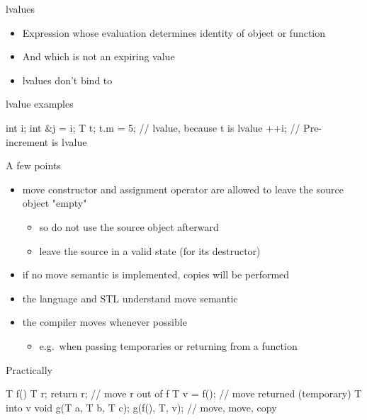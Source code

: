 \begin{frame}[fragile]
  \begin{block}{lvalues}
    \begin{itemize}
      \item Expression whose evaluation determines identity of object or function
      \item And which is not an expiring value
      \item lvalues don't bind to 
    \end{itemize}
  \end{block}
  \begin{exampleblock}{lvalue examples}
    \begin{cppcode*}{}
      int i;
      int &j = i;
      T t;
      t.m = 5; // lvalue, because t is lvalue
      ++i; // Pre-increment is lvalue
    \end{cppcode*}
  \end{exampleblock}
\end{frame}

\begin{frame}[fragile]
  \begin{block}{A few points}
    \begin{itemize}
    \item move constructor and assignment operator are allowed to leave the source object "empty"
      \begin{itemize}
      \item so do not use the source object afterward
      \item leave the source in a valid state (for its destructor)
      \end{itemize}
    \item if no move semantic is implemented, copies will be performed
    \item the language and STL understand move semantic
    \item the compiler moves whenever possible
      \begin{itemize}
      \item e.g.\ when passing temporaries or returning from a function
      \end{itemize}
    \end{itemize}
  \end{block}
  \pause
  \begin{exampleblock}{Practically}
    \begin{cppcode*}{}
      T f() { T r; return r; } // move r out of f
      T v = f(); // move returned (temporary) T into v
      void g(T a, T b, T c);
      g(f(), T{}, v); // move, move, copy
    \end{cppcode*}
  \end{exampleblock}
\end{frame}

